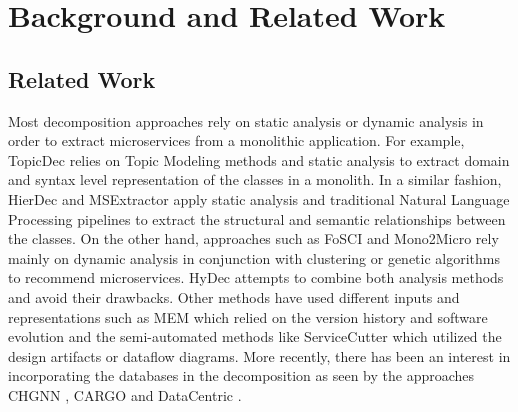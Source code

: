 




\section{Background and Related Work}









\subsection{Related Work}
Most decomposition approaches rely on static analysis or dynamic analysis in order to extract microservices from a monolithic application. For example, TopicDec \cite{brito2021topicmodeling} relies on Topic Modeling methods and static analysis to extract domain and syntax level representation of the classes in a monolith. In a similar fashion, HierDec \cite{khaled2022hierdecomp} and MSExtractor \cite{khaled2022msextractor,saidani2019msextractor} apply static analysis and traditional Natural Language Processing pipelines to extract the structural and semantic relationships between the classes. On the other hand, approaches such as FoSCI \cite{jin2021fosci} and Mono2Micro \cite{kalia2021mono2micro} rely mainly on dynamic analysis in conjunction with clustering or genetic algorithms to recommend microservices. HyDec \cite{khaled2022hydecomp} attempts to combine both analysis methods and avoid their drawbacks. Other methods have used different inputs and representations such as MEM \cite{mazlami2017mem} which relied on the version history and software evolution \cite{benomar2015evolution} and the semi-automated methods \cite{daoud2023multimodeldec,li2019dataflowdec} like ServiceCutter \cite{gysel2016servicecutter} which utilized the design artifacts or dataflow diagrams. More recently, there has been an interest in incorporating the databases in the decomposition as seen by the approaches CHGNN \cite{mathai2022chgnn}, CARGO \cite{vikram2022cargo} and DataCentric \cite{yamina2022datacentric}. 




